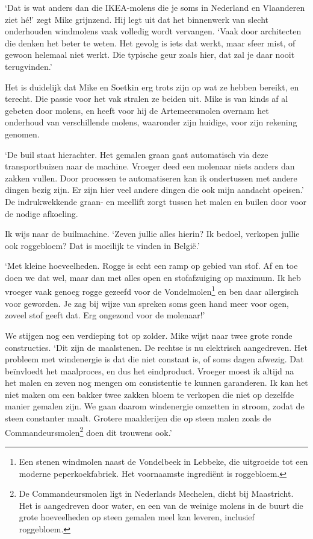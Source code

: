 \documentclass[
  11pt,
  dutch,
]{memoir}
\begin{document}
`Dat is wat anders dan die IKEA-molens die je soms in Nederland en
Vlaanderen ziet hé!' zegt Mike grijnzend. Hij legt uit dat het
binnenwerk van slecht onderhouden windmolens vaak volledig wordt
vervangen. `Vaak door architecten die denken het beter te weten. Het
gevolg is iets dat werkt, maar sfeer mist, of gewoon helemaal niet
werkt. Die typische geur zoals hier, dat zal je daar nooit terugvinden.'

Het is duidelijk dat Mike en Soetkin erg trots zijn op wat ze hebben
bereikt, en terecht. Die passie voor het vak stralen ze beiden uit. Mike
is van kinds af al gebeten door molens, en heeft voor hij de
Artemeersmolen overnam het onderhoud van verschillende molens, waaronder
zijn huidige, voor zijn rekening genomen.

`De buil staat hierachter. Het gemalen graan gaat automatisch via deze
transportbuizen naar de machine. Vroeger deed een molenaar niets anders
dan zakken vullen. Door processen te automatiseren kan ik ondertussen
met andere dingen bezig zijn. Er zijn hier veel andere dingen die ook
mijn aandacht opeisen.' De indrukwekkende graan- en meellift zorgt
tussen het malen en builen door voor de nodige afkoeling.

Ik wijs naar de builmachine. `Zeven jullie alles hierin? Ik bedoel,
verkopen jullie ook roggebloem? Dat is moeilijk te vinden in België.'

`Met kleine hoeveelheden. Rogge is echt een ramp op gebied van stof. Af
en toe doen we dat wel, maar dan met alles open en stofafzuiging op
maximum. Ik heb vroeger vaak genoeg rogge gezeefd voor de
Vondelmolen\footnote{Een stenen windmolen naast de Vondelbeek in
  Lebbeke, die uitgroeide tot een moderne peperkoekfabriek. Het
  voornaamste ingrediënt is roggebloem.} en ben daar allergisch voor
geworden. Je zag bij wijze van spreken soms geen hand meer voor ogen,
zoveel stof geeft dat. Erg ongezond voor de molenaar!'

We stijgen nog een verdieping tot op zolder. Mike wijst naar twee grote
ronde constructies. `Dit zijn de maalstenen. De rechtse is nu elektrisch
aangedreven. Het probleem met windenergie is dat die niet constant is,
of soms dagen afwezig. Dat beïnvloedt het maalproces, en dus het
eindproduct. Vroeger moest ik altijd na het malen en zeven nog mengen om
consistentie te kunnen garanderen. Ik kan het niet maken om een bakker
twee zakken bloem te verkopen die niet op dezelfde manier gemalen zijn.
We gaan daarom windenergie omzetten in stroom, zodat de steen constanter
maalt. Grotere maalderijen die op steen malen zoals de
Commandeursmolen\footnote{De Commandeursmolen ligt in Nederlands
  Mechelen, dicht bij Maastricht. Het is aangedreven door water, en een
  van de weinige molens in de buurt die grote hoeveelheden op steen
  gemalen meel kan leveren, inclusief roggebloem.} doen dit trouwens
ook.'
\end{document}
